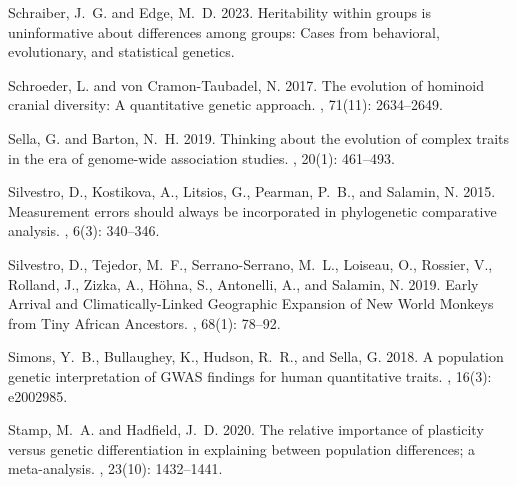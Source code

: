 \documentclass{article}
\begin{document}
\begin{thebibliography}{}
    Schraiber, J.~G. and Edge, M.~D. 2023.
    \newblock Heritability within groups is uninformative about differences among
    groups: Cases from behavioral, evolutionary, and statistical genetics.

    Schroeder, L. and {von Cramon-Taubadel}, N. 2017.
    \newblock The evolution of hominoid cranial diversity: {{A}} quantitative
    genetic approach.
    , {71}(11): 2634--2649.

    Sella, G. and Barton, N.~H. 2019.
    \newblock Thinking about the evolution of complex traits in the era of
    genome-wide association studies.
    , {20}(1):
    461--493.

    Silvestro, D., Kostikova, A., Litsios, G., Pearman, P.~B., and Salamin, N.
    2015.
    \newblock Measurement errors should always be incorporated in phylogenetic
    comparative analysis.
    , {6}(3): 340--346.

    Silvestro, D., Tejedor, M.~F., {Serrano-Serrano}, M.~L., Loiseau, O., Rossier,
    V., Rolland, J., Zizka, A., H{\"o}hna, S., Antonelli, A., and Salamin, N.
    2019.
    \newblock Early {{Arrival}} and {{Climatically-Linked Geographic Expansion}} of
        {{New World Monkeys}} from {{Tiny African Ancestors}}.
    , {68}(1): 78--92.

    Simons, Y.~B., Bullaughey, K., Hudson, R.~R., and Sella, G. 2018.
    \newblock A population genetic interpretation of {{GWAS}} findings for human
    quantitative traits.
    , {16}(3): e2002985.

    Stamp, M.~A. and Hadfield, J.~D. 2020.
    \newblock The relative importance of plasticity versus genetic differentiation
    in explaining between population differences; a meta-analysis.
    , {23}(10): 1432--1441.


\end{thebibliography}
\end{document}
